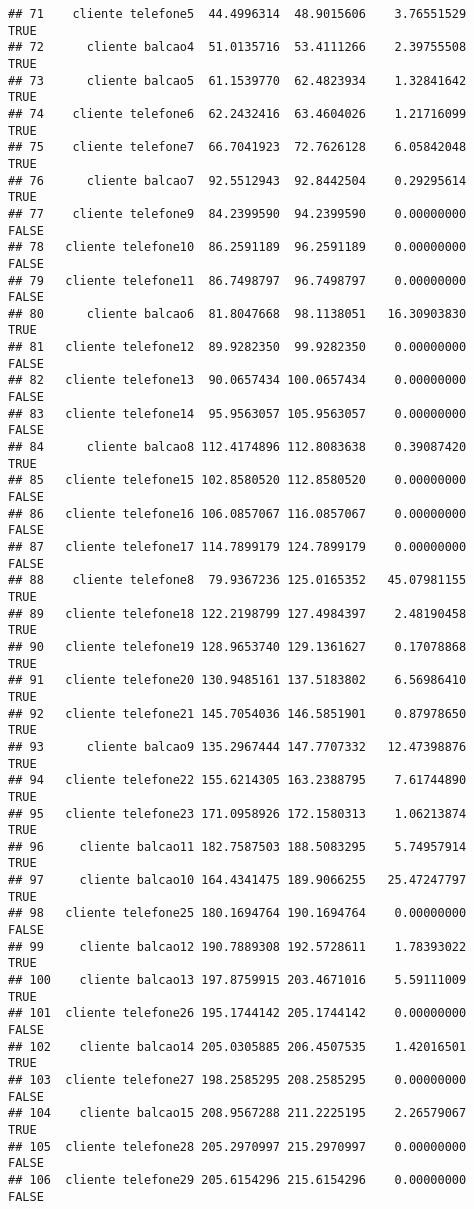 \documentclass[
]{article}
\begin{document}
\begin{verbatim}
## 71    cliente telefone5  44.4996314  48.9015606    3.76551529     TRUE
## 72      cliente balcao4  51.0135716  53.4111266    2.39755508     TRUE
## 73      cliente balcao5  61.1539770  62.4823934    1.32841642     TRUE
## 74    cliente telefone6  62.2432416  63.4604026    1.21716099     TRUE
## 75    cliente telefone7  66.7041923  72.7626128    6.05842048     TRUE
## 76      cliente balcao7  92.5512943  92.8442504    0.29295614     TRUE
## 77    cliente telefone9  84.2399590  94.2399590    0.00000000    FALSE
## 78   cliente telefone10  86.2591189  96.2591189    0.00000000    FALSE
## 79   cliente telefone11  86.7498797  96.7498797    0.00000000    FALSE
## 80      cliente balcao6  81.8047668  98.1138051   16.30903830     TRUE
## 81   cliente telefone12  89.9282350  99.9282350    0.00000000    FALSE
## 82   cliente telefone13  90.0657434 100.0657434    0.00000000    FALSE
## 83   cliente telefone14  95.9563057 105.9563057    0.00000000    FALSE
## 84      cliente balcao8 112.4174896 112.8083638    0.39087420     TRUE
## 85   cliente telefone15 102.8580520 112.8580520    0.00000000    FALSE
## 86   cliente telefone16 106.0857067 116.0857067    0.00000000    FALSE
## 87   cliente telefone17 114.7899179 124.7899179    0.00000000    FALSE
## 88    cliente telefone8  79.9367236 125.0165352   45.07981155     TRUE
## 89   cliente telefone18 122.2198799 127.4984397    2.48190458     TRUE
## 90   cliente telefone19 128.9653740 129.1361627    0.17078868     TRUE
## 91   cliente telefone20 130.9485161 137.5183802    6.56986410     TRUE
## 92   cliente telefone21 145.7054036 146.5851901    0.87978650     TRUE
## 93      cliente balcao9 135.2967444 147.7707332   12.47398876     TRUE
## 94   cliente telefone22 155.6214305 163.2388795    7.61744890     TRUE
## 95   cliente telefone23 171.0958926 172.1580313    1.06213874     TRUE
## 96     cliente balcao11 182.7587503 188.5083295    5.74957914     TRUE
## 97     cliente balcao10 164.4341475 189.9066255   25.47247797     TRUE
## 98   cliente telefone25 180.1694764 190.1694764    0.00000000    FALSE
## 99     cliente balcao12 190.7889308 192.5728611    1.78393022     TRUE
## 100    cliente balcao13 197.8759915 203.4671016    5.59111009     TRUE
## 101  cliente telefone26 195.1744142 205.1744142    0.00000000    FALSE
## 102    cliente balcao14 205.0305885 206.4507535    1.42016501     TRUE
## 103  cliente telefone27 198.2585295 208.2585295    0.00000000    FALSE
## 104    cliente balcao15 208.9567288 211.2225195    2.26579067     TRUE
## 105  cliente telefone28 205.2970997 215.2970997    0.00000000    FALSE
## 106  cliente telefone29 205.6154296 215.6154296    0.00000000    FALSE

\end{verbatim}
\end{document}
